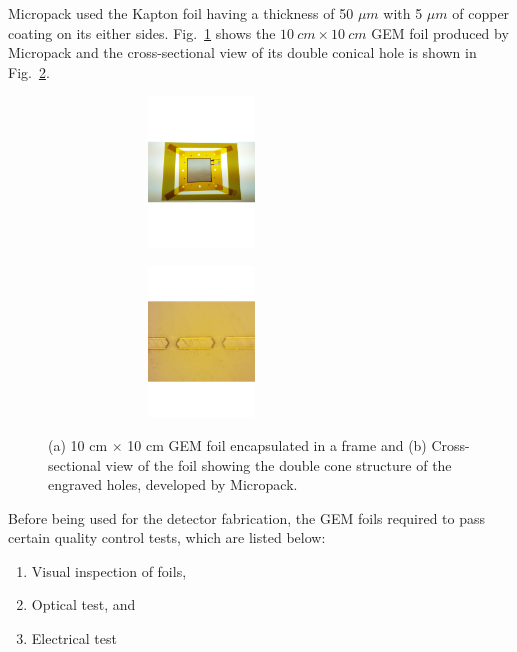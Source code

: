 Micropack used the Kapton foil having a thickness of 50 $\mu m$ with 5 $\mu m$ of copper coating on its either sides. Fig.~\ref{fig:Foil_and_Cone_a} shows the $10~cm\times10~cm$ GEM foil produced by Micropack and the cross-sectional view of its double conical hole is shown in Fig.~\ref{fig:Foil_and_Cone_b}.
\begin{figure}[!htbp]
    \centering
    \begin{subfigure}[b]{0.46\textwidth}
        \includegraphics[width=6cm, height=4cm]{figures/GEM/figures/Foil_01.pdf}\qquad
        \caption{ }
        \label{fig:Foil_and_Cone_a}
    \end{subfigure}
    \begin{subfigure}[b]{0.46\textwidth}
        \includegraphics[width=6cm, height=4cm]{figures/GEM/figures/double_cone.pdf}
        \caption{ }
        \label{fig:Foil_and_Cone_b}
    \end{subfigure}
   \caption{(a) 10 cm $\times$ 10 cm GEM foil encapsulated in a frame and (b) Cross-sectional view of the foil showing the double cone structure of the engraved holes, developed by Micropack.} \label{fig:Foil_and_Cone}
\end{figure}

Before being used for the detector fabrication, the GEM foils required to pass certain quality control tests, which are listed below:
\begin{enumerate}
    \item Visual inspection of foils,
    \item Optical test, and 
    \item Electrical test
\end{enumerate}

